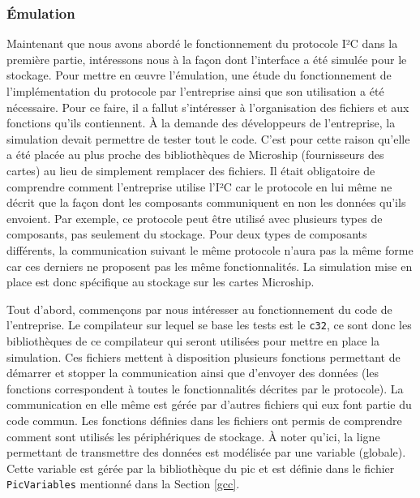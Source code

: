 \documentclass[a4paper]{article}
\begin{document}
\subsubsection*{Émulation}

Maintenant que nous avons abordé le fonctionnement du protocole I²C dans la
première partie, intéressons nous à la façon dont l'interface a été simulée pour
le stockage. Pour mettre en œuvre l'émulation, une étude du fonctionnement de
l'implémentation du protocole par l'entreprise ainsi que son utilisation a été
nécessaire. Pour ce faire, il a fallut s'intéresser à l'organisation des
fichiers et aux fonctions qu'ils contiennent. À la demande des développeurs de
l'entreprise, la simulation devait permettre de tester tout le code. C'est pour
cette raison qu'elle a été placée au plus proche des bibliothèques de Microship
(fournisseurs des cartes) au lieu de simplement remplacer des fichiers. Il était
obligatoire de comprendre comment l'entreprise utilise l'I²C car le protocole en
lui même ne décrit que la façon dont les composants communiquent en non les
données qu'ils envoient. Par exemple, ce protocole peut être utilisé avec
plusieurs types de composants, pas seulement du stockage. Pour deux types de
composants différents, la communication suivant le même protocole n'aura pas la
même forme car ces derniers ne proposent pas les même fonctionnalités. La
simulation mise en place est donc spécifique au stockage sur les cartes
Microship.

Tout d'abord, commençons par nous intéresser au fonctionnement du code de
l'entreprise. Le compilateur sur lequel se base les tests est le \verb|c32|, ce
sont donc les bibliothèques de ce compilateur qui seront utilisées pour mettre
en place la simulation. Ces fichiers mettent à disposition plusieurs fonctions
permettant de démarrer et stopper la communication ainsi que d'envoyer des
données (les fonctions correspondent à toutes le fonctionnalités décrites par le
protocole). La communication en elle même est gérée par d'autres fichiers qui
eux font partie du code commun. Les fonctions définies dans les fichiers ont
permis de comprendre comment sont utilisés les périphériques de stockage. À
noter qu'ici, la ligne permettant de transmettre des données est modélisée par
une variable (globale). Cette variable est gérée par la bibliothèque du
\gls{pic} et est définie dans le fichier \verb|PicVariables| mentionné dans la
Section \ref{gcc}.
\end{document}
